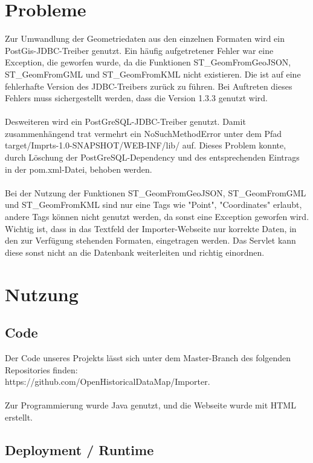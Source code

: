 \documentclass[]{article}
\begin{document}
\section{Probleme}
Zur Umwandlung der Geometriedaten aus den einzelnen Formaten wird ein PostGis-JDBC-Treiber genutzt. Ein häufig aufgetretener Fehler war eine Exception, die geworfen wurde, da die Funktionen ST\_GeomFromGeoJSON, \\ST\_GeomFromGML und ST\_GeomFromKML nicht existieren. Die ist auf eine fehlerhafte Version des JDBC-Treibers zurück zu führen. Bei Auftreten dieses Fehlers muss sichergestellt werden, dass die Version 1.3.3 genutzt wird.\\
\\

Desweiteren wird ein PostGreSQL-JDBC-Treiber genutzt. Damit zusammenhängend trat vermehrt ein NoSuchMethodError unter dem Pfad target/Imprts-1.0-SNAPSHOT/WEB-INF/lib/ auf. Dieses Problem konnte, durch Löschung der PostGreSQL-Dependency und des entsprechenden Eintrags in der pom.xml-Datei, behoben werden.\\
\\

Bei der Nutzung der Funktionen ST\_GeomFromGeoJSON, ST\_GeomFromGML und ST\_GeomFromKML sind nur eine Tags wie "Point", "Coordinates" erlaubt, andere Tags können nicht genutzt werden, da sonst eine Exception geworfen wird. Wichtig ist, dass in das Textfeld der Importer-Webseite nur korrekte Daten, in den zur Verfügung stehenden Formaten, eingetragen werden. Das Servlet kann diese sonst nicht an die Datenbank weiterleiten und richtig einordnen.

\section{Nutzung}
\subsection{Code}
Der Code unseres Projekts lässt sich unter dem Master-Branch des folgenden Repositories finden: \\https://github.com/OpenHistoricalDataMap/Importer. \\
\\
Zur Programmierung wurde Java genutzt, und die Webseite wurde mit HTML erstellt.

\subsection{Deployment / Runtime}
\end{document}
